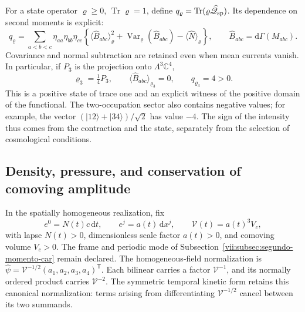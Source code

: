 For a state operator \(\varrho\geq0\),
\(\operatorname{Tr}\varrho=1\), define
\(q_\varrho=\operatorname{Tr}(\varrho\widehat{\mathscr Q}_{\rm sp})\).
Its dependence on second moments is explicit:
\begin{equation}
 q_\varrho=\sum_{a<b<c}\eta_{aa}\eta_{bb}\eta_{cc}
 \left\{
  \langle\widehat B_{abc}\rangle_\varrho^2
  +\operatorname{Var}_\varrho(\widehat B_{abc})
  -\langle\widehat N\rangle_\varrho
 \right\},\qquad
 \widehat B_{abc}=\mathrm d\Gamma(M_{abc}).
 \label{vii:eq:covarianza-espin-material}
\end{equation}
Covariance and normal subtraction are retained even when mean
currents vanish. In particular, if \(P_3\) is the projection
onto \(\Lambda^3\mathbb C^4\),
\begin{equation}
 \varrho_3=\tfrac14P_3,\qquad
 \langle\widehat B_{abc}\rangle_{\varrho_3}=0,\qquad
 q_{\varrho_3}=4>0.
 \label{vii:eq:testigo-positivo-espin}
\end{equation}
This is a positive state of trace one and an explicit witness of
the positive domain of the functional. The two-occupation sector
also contains negative values; for example, the vector
\((|12\rangle+|34\rangle)/\sqrt2\) has value \(-4\).
The sign of the intensity thus comes from the contraction and the
state, separately from the selection of cosmological conditions.

\subsection{Density, pressure, and conservation of comoving amplitude}
\label{vii:subsec:amplitud-espinorial-comovil}

In the spatially homogeneous realization, fix
\[
 e^0=N(t)c\,\mathrm dt,\qquad e^j=a(t)\,\mathrm dx^j,
 \qquad \mathcal V(t)=a(t)^3V_c,
\]
with lapse \(N(t)>0\), dimensionless scale factor \(a(t)>0\),
and comoving volume \(V_c>0\). The frame and periodic mode of
Subsection~\ref{vii:subsec:segundo-momento-car} remain declared.
The homogeneous-field normalization is
\(\widehat\psi=\mathcal V^{-1/2}(a_1,a_2,a_3,a_4)^{\mathsf T}\).
Each bilinear carries a factor \(\mathcal V^{-1}\), and its
normally ordered product carries \(\mathcal V^{-2}\). The
symmetric temporal kinetic form retains this canonical normalization:
terms arising from differentiating \(\mathcal V^{-1/2}\)
cancel between its two summands.

